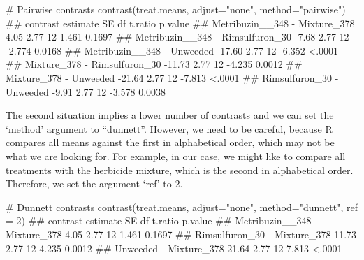 \documentclass[a4paper,12pt,oneside]{book}
\newenvironment{Shaded}{\begin{snugshade}}{\end{snugshade}}
\newcommand{\DecValTok}[1]{#1}
\newcommand{\StringTok}[1]{#1}
\newcommand{\CommentTok}[1]{#1}
\newcommand{\DocumentationTok}[1]{#1}
\newcommand{\FunctionTok}[1]{#1}
\newcommand{\AttributeTok}[1]{#1}
\newcommand{\NormalTok}[1]{#1}
\begin{document}
\footnotesize

\begin{Shaded}
\begin{Highlighting}[]
\CommentTok{\# Pairwise contrasts}
\FunctionTok{contrast}\NormalTok{(treat.means, }\AttributeTok{adjust=}\StringTok{"none"}\NormalTok{, }\AttributeTok{method=}\StringTok{"pairwise"}\NormalTok{)}
\DocumentationTok{\#\#  contrast                         estimate   SE df t.ratio p.value}
\DocumentationTok{\#\#  Metribuzin\_\_348 {-} Mixture\_378        4.05 2.77 12   1.461  0.1697}
\DocumentationTok{\#\#  Metribuzin\_\_348 {-} Rimsulfuron\_30    {-}7.68 2.77 12  {-}2.774  0.0168}
\DocumentationTok{\#\#  Metribuzin\_\_348 {-} Unweeded         {-}17.60 2.77 12  {-}6.352  \textless{}.0001}
\DocumentationTok{\#\#  Mixture\_378 {-} Rimsulfuron\_30       {-}11.73 2.77 12  {-}4.235  0.0012}
\DocumentationTok{\#\#  Mixture\_378 {-} Unweeded             {-}21.64 2.77 12  {-}7.813  \textless{}.0001}
\DocumentationTok{\#\#  Rimsulfuron\_30 {-} Unweeded           {-}9.91 2.77 12  {-}3.578  0.0038}
\end{Highlighting}
\end{Shaded}

\normalsize

The second situation implies a lower number of contrasts and we can set the `method' argument to ``dunnett''. However, we need to be careful, because R compares all means against the first in alphabetical order, which may not be what we are looking for. For example, in our case, we might like to compare all treatments with the herbicide mixture, which is the second in alphabetical order. Therefore, we set the argument `ref' to 2.

\footnotesize

\begin{Shaded}
\begin{Highlighting}[]
\CommentTok{\# Dunnett contrasts}
\FunctionTok{contrast}\NormalTok{(treat.means, }\AttributeTok{adjust=}\StringTok{"none"}\NormalTok{, }\AttributeTok{method=}\StringTok{"dunnett"}\NormalTok{, }\AttributeTok{ref =} \DecValTok{2}\NormalTok{)}
\DocumentationTok{\#\#  contrast                      estimate   SE df t.ratio p.value}
\DocumentationTok{\#\#  Metribuzin\_\_348 {-} Mixture\_378     4.05 2.77 12   1.461  0.1697}
\DocumentationTok{\#\#  Rimsulfuron\_30 {-} Mixture\_378     11.73 2.77 12   4.235  0.0012}
\DocumentationTok{\#\#  Unweeded {-} Mixture\_378           21.64 2.77 12   7.813  \textless{}.0001}
\end{Highlighting}
\end{Shaded}
\end{document}
